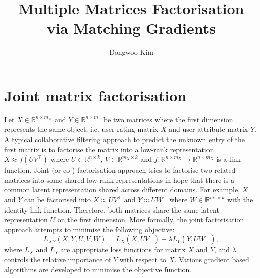 \documentclass{article} %
\title{Multiple Matrices Factorisation\\ via Matching Gradients}
\author{
Dongwoo Kim
}
\theoremstyle{definition}
\begin{document}
\maketitle


\section{Joint matrix factorisation}
Let $X \in \mathbb{R}^{n \times m_X}$ and $Y \in \mathbb{R}^{n \times m_Y}$ be two matrices where the first dimension represents the same object, i.e. user-rating matrix $X$ and user-attribute matrix $Y$. A typical collaborative filtering approach to predict the unknown entry of the first matrix is to factorise the matrix into a low-rank representation $X \approx f(UV^\top)$ where $U\in\mathbb{R}^{n\times k}$, $V\in \mathbb{R}^{m_X \times k}$ and $f:\mathbb{R}^{n \times m_X} \rightarrow \mathbb{R} ^{n \times m_X}$ is a link function. Joint (or co-) factorisation approach tries to factorise two related matrices into some shared low-rank representations in hope that there is a common latent representation shared across different domains. For example, $X$ and $Y$ can be factorised into $X \approx UV^\top$ and $Y \approx UW^\top$ where $W \in \mathbb{R}^{m_Y \times k}$ with the identity link function. Therefore, both matrices share the same latent representation $U$ on the first dimension. More formally, the joint factorisation approach attempts to minimise the following objective:
\begin{equation}
\label{eqn:joint_obj}
L_{XY}(X,Y,U,V,W) = L_X(X, UV^\top) + \lambda L_Y(Y, UW^\top),
\end{equation}
where $L_X$ and $L_Y$ are appropriate loss functions for matrix $X$ and $Y$, and $\lambda$ controls the relative importance of $Y$ with respect to $X$. Various gradient based algorithms are developed to minimise the objective function.
\end{document}

